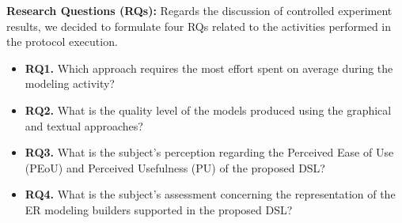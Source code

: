 \textbf{Research Questions (RQs):}
Regards the discussion of controlled experiment results, we decided to formulate four RQs related to the activities performed in the protocol execution.
\begin{itemize}
    \item \textbf{RQ1.} Which approach requires the most effort spent on average during the modeling activity?
    \item \textbf{RQ2.} What is the quality level of the models produced using the graphical and textual approaches?
    \item \textbf{RQ3.} What is the subject's perception regarding the Perceived Ease of Use (PEoU) and Perceived Usefulness (PU) of the proposed DSL?
    \item \textbf{RQ4.} What is the subject's assessment concerning the representation of the ER modeling builders supported in the proposed DSL?
\end{itemize}

